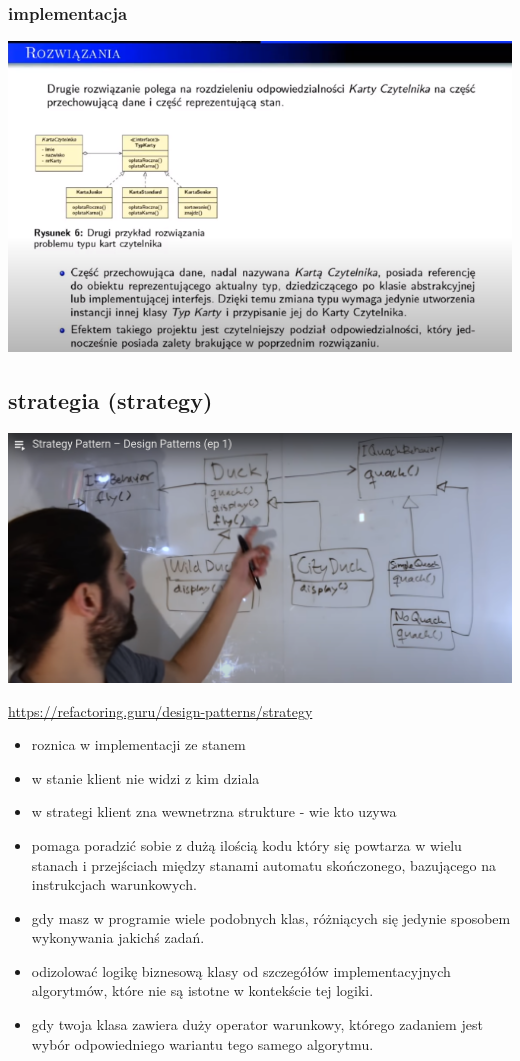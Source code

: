 \documentclass[11pt]{article}
\begin{document}
\subsubsection{implementacja}
\label{sec:org32822a7}
\begin{center}
\includegraphics[width=.9\linewidth]{./stan.png}
\end{center}
\subsection{strategia (strategy)}
\label{sec:org50854dd}
\begin{center}
\includegraphics[width=.9\linewidth]{./strategy.png}
\end{center}

\url{https://refactoring.guru/design-patterns/strategy}
\begin{itemize}
\item roznica w implementacji ze stanem
\item w stanie klient nie widzi z kim dziala
\item w strategi klient zna wewnetrzna strukture - wie kto uzywa
\item pomaga poradzić sobie z dużą ilością kodu który się powtarza w wielu stanach i przejściach między stanami automatu skończonego, bazującego na instrukcjach warunkowych.
\item gdy masz w programie wiele podobnych klas, różniących się jedynie sposobem wykonywania jakichś zadań.
\item odizolować logikę biznesową klasy od szczegółów implementacyjnych algorytmów, które nie są istotne w kontekście tej logiki.
\item gdy twoja klasa zawiera duży operator warunkowy, którego zadaniem jest wybór odpowiedniego wariantu tego samego algorytmu.
\end{itemize}
\end{document}
